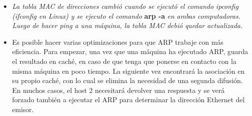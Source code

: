 {\begin{itemize}
\begin{itemize}
            \item[] \textit{La tabla MAC de direcciones cambi\'o cuando se ejecut\'o el comando ipconfig (ifconfig en Linux) y se ejecuto el
            comando} \textbf{arp -a} \textit{en ambas computadoras. Luego de hacer ping a una m\'aquina, la tabla MAC debi\'o quedar actualizada.}

            \item [] Es posible hacer varias optimizaciones para que ARP trabaje con m\'as eficiencia. Para empezar, una
            vez que una m\'aquina ha ejecutado ARP, guarda el resultado en cach\'e, en caso de que tenga que ponerse
            en contacto con la misma m\'aquina en poco tiempo. La siguiente vez encontrar\'a la asociaci\'on en su propio
            cach\'e, con lo cual se elimina la necesidad de una segunda difusi\'on. En muchos casos, el host 2 necesitar\'a
            devolver una respuesta y se ver\'a forzado tambi\'en a ejecutar el ARP para determinar la direcci\'on Ethernet
            del emisor. \cite{Tanenbaum}
        \end{itemize}
    \end{itemize}
}